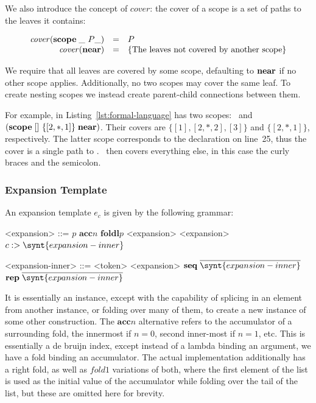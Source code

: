 \documentclass{kththesis}
\begin{document}
\newcommand{\cover}{\ensuremath{\mathit{cover}}}
We also introduce the concept of \cover: the cover of a scope is a set of paths to the leaves it contains:

$$
\begin{array}{rcl}
\cover(\scope \_\ P \_) & = & P \\
\cover(\near) & = & \{\text{The leaves not covered by another scope}\} \\
\end{array}
$$

We require that all leaves are covered by some scope, defaulting to $\mathrel{\mathbf{near}}$ if no other scope applies. Additionally, no two scopes may cover the same leaf. To create nesting scopes we instead create parent-child connections between them.

For example,  in Listing~\ref{lst:formal-language} has two scopes: \near\ and $(\mathrel{\mathbf{scope}} []\ \{[2, *, 1]\} \mathrel{\mathbf{near}})$. Their covers are $\{[1], [2, *, 2], [3]\}$ and $\{[2, *, 1]\}$, respectively. The latter scope corresponds to the  declaration on line~25, thus the cover is a single path to . \near\ then covers everything else, in this case the curly braces and the semicolon.

\subsubsection{Expansion Template}

An expansion template $e_c$ is given by the following grammar:

\newcommand{\acc}{\mathrel{\mathbf{acc}}}
\newcommand{\foldl}{\mathrel{\mathbf{foldl}}}

\setlength{\grammarindent}{12em}
\begin{grammar}
<expansion> ::= $p$
  \alt $\acc n$
  \alt $\foldl p$ <expansion> <expansion>
  \alt $c :> \synt{expansion-inner}$

<expansion-inner> ::= <token>
  \alt <expansion>
  \alt $\seq \overline{\synt{expansion-inner}}$
  \alt $\repseq \overline{\synt{expansion-inner}}$
\end{grammar}

It is essentially an instance, except with the capability of splicing in an element from another instance, or folding over many of them, to create a new instance of some other construction. The $\acc n$ alternative refers to the accumulator of a surrounding fold, the innermost if $n = 0$, second inner-most if $n = 1$, etc. This is essentially a de bruijn index, except instead of a lambda binding an argument, we have a fold binding an accumulator. The actual implementation additionally has a right fold, as well as $\mathit{fold1}$ variations of both, where the first element of the list is used as the initial value of the accumulator while folding over the tail of the list, but these are omitted here for brevity.
\end{document}
